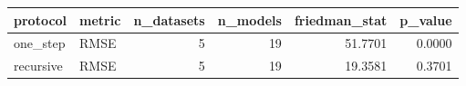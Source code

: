 \begin{tabular}{llrrrr}
\toprule
protocol & metric & n_datasets & n_models & friedman_stat & p_value \\
\midrule
one_step & RMSE & 5 & 19 & 51.7701 & 0.0000 \\
recursive & RMSE & 5 & 19 & 19.3581 & 0.3701 \\
\bottomrule
\end{tabular}
